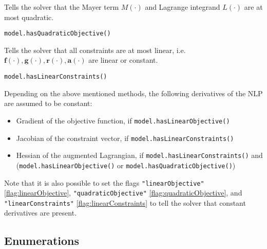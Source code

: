 \documentclass[12pt]{article}
\renewcommand{\v}{\bm}
\begin{document}
\begin{mdframed}[backgroundcolor=gray!10, roundcorner=10pt,
		linewidth=1pt]

	Tells the solver that the Mayer term $M(\cdot)$ and Lagrange integrand $L(\cdot)$ are at
	most quadratic.

	\begin{lstlisting}
model.hasQuadraticObjective()
	\end{lstlisting}
	\label{hasQuadraticObjective}

\end{mdframed}

\begin{mdframed}[backgroundcolor=gray!10, roundcorner=10pt,
		linewidth=1pt]

	Tells the solver that all constraints are at most linear, i.e.
	$\v{f}(\cdot), \v{g}(\cdot), \v{r}(\cdot), \v{a}(\cdot)$ are linear or
	constant.

	\begin{lstlisting}
model.hasLinearConstraints()
		\end{lstlisting}
	\label{hasLinearConstraints}

\end{mdframed}

Depending on the above mentioned methods, the following derivatives of
the NLP are assumed to be constant:

\begin{itemize}
	\item Gradient of the objective function, if
	      \texttt{model.hasLinearObjective()}
	\item Jacobian of the constraint vector, if
	      \texttt{model.hasLinearConstraints()}
	\item Hessian of the augmented Lagrangian, if
	      \texttt{model.hasLinearConstraints()} and \\
	      (\texttt{model.hasLinearObjective()}
	      or \texttt{model.hasQuadraticObjective()})
\end{itemize}

Note that it is also possible to set the flags \texttt{"linearObjective"} \eqref{flag:linearObjective}, \texttt{"quadraticObjective"} \eqref{flag:quadraticObjective}, and \texttt{"linearConstraints"} \eqref{flag:linearConstraints} to tell the solver that constant derivatives are present.

\subsection{Enumerations}
\end{document}
